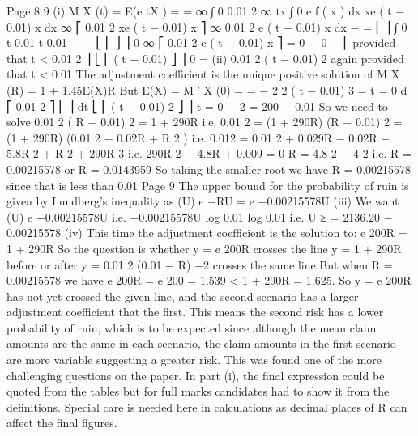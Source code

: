 Page 8%
9
(i)
M X (t) = E(e tX ) =
=
∞
∫ 0 0.01
2
∞ tx
∫ 0 e
f ( x ) dx
xe ( t − 0.01) x dx
∞
⎡ 0.01 2 xe ( t − 0.01) x ⎤
∞ 0.01 2 e ( t − 0.01) x
dx
−
= ⎢
⎥
∫
0
t
0.01
t
0.01
−
−
⎣ ⎢
⎦ ⎥ 0
∞
⎡ 0.01 2 e ( t − 0.01) x ⎤
= 0 − 0 − ⎢
provided that t < 0.01
2 ⎥
⎣ ⎢ ( t − 0.01) ⎦ ⎥ 0
=
(ii)
0.01 2
( t − 0.01) 2
again provided that t < 0.01
The adjustment coefficient is the unique positive solution of
M X (R) = 1 + 1.45E(X)R
But E(X) = M ′ X (0) =
=
− 2  2
( t − 0.01) 3
=
t = 0
d ⎡ 0.01 2 ⎤
⎢
⎥
dt ⎣ ⎢ ( t − 0.01) 2 ⎦ ⎥
t = 0
− 2
= 200
− 0.01
So we need to solve
0.01 2
( R − 0.01) 2
= 1 + 290R
i.e. 0.01 2 = (1 + 290R) (R − 0.01) 2 = (1 + 290R) (0.01 2 − 0.02R + R 2 )
i.e. 0.012 = 0.01 2 + 0.029R − 0.02R − 5.8R 2 + R 2 + 290R 3
i.e. 290R 2 − 4.8R + 0.009 = 0
R =
4.8  2 − 4  
2 
i.e. R = 0.00215578 or R = 0.0143959
So taking the smaller root we have R = 0.00215578 since that is less than 0.01
Page 9%
The upper bound for the probability of ruin is given by Lundberg’s inequality
as
\psi (U) \leq  e −RU = e −0.00215578U
(iii)
We want \psi (U) \leq  e −0.00215578U 
i.e. −0.00215578U \leq  log 0.01
log 0.01
i.e. U ≥
= 2136.20
− 0.00215578
(iv)
This time the adjustment coefficient is the solution to:
e 200R = 1 + 290R
So the question is whether y = e 200R crosses the line y = 1 + 290R before or
after y = 0.01 2 (0.01 − R) −2 crosses the same line
But when R = 0.00215578 we have
e 200R = e 200 = 1.539 < 1 + 290R = 1.625.
So y = e 200R has not yet crossed the given line, and the second scenario has a
larger adjustment coefficient that the first.
This means the second risk has a lower probability of ruin, which is to be
expected since although the mean claim amounts are the same in each
scenario, the claim amounts in the first scenario are more variable suggesting a
greater risk.
This was found one of the more challenging questions on the paper. In part (i), the final
expression could be quoted from the tables but for full marks candidates had to show it from
the definitions. Special care is needed here in calculations as decimal places of R can affect
the final figures.
